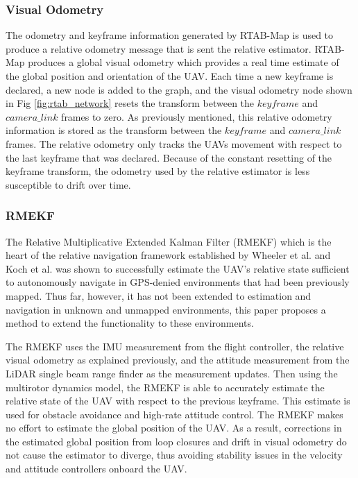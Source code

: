 \documentclass[letterpaper, 10 pt, conference]{ieeeconf}  %
\begin{document}
\subsubsection{Visual Odometry} \label{vis_odom}

The odometry and keyframe information generated by RTAB-Map is used to produce a relative odometry message that is sent the relative estimator. RTAB-Map produces a global visual odometry which provides a real time estimate of the global position and orientation of the UAV. Each time a new keyframe is declared, a new node is added to the graph, and the visual odometry node shown in Fig \ref{fig:rtab_network} resets the transform between the $\mathit{keyframe}$ and $\mathit{camera\_link}$ frames to zero. As previously mentioned, this relative odometry information is stored as the transform between the $\mathit{keyframe}$ and $\mathit{camera\_link}$ frames. The relative odometry only tracks the UAVs movement with respect to the last keyframe that was declared. Because of the constant resetting of the keyframe transform, the odometry used by the relative estimator is less susceptible to drift over time.

\subsubsection{RMEKF}

The Relative Multiplicative Extended Kalman Filter (RMEKF) which is the heart of the relative navigation framework established by Wheeler et al. \cite{Wheeler2017}\cite{Wheeler2018} and Koch et al. \cite{Koch2017} was shown to successfully estimate the UAV's relative state sufficient to autonomously navigate in GPS-denied environments that had been previously mapped. Thus far, however, it has not been extended to estimation and navigation in unknown and unmapped environments, this paper proposes a method to extend the functionality to these environments.

The RMEKF uses the IMU measurement from the flight controller, the relative visual odometry as explained previously, and the attitude measurement from the LiDAR single beam range finder as the measurement updates. Then using the multirotor dynamics model, the RMEKF is able to accurately estimate the relative state of the UAV with respect to the previous keyframe. This estimate is used for obstacle avoidance and high-rate attitude control. The RMEKF makes no effort to estimate the global position of the UAV. As a result, corrections in the estimated global position from loop closures and drift in visual odometry do not cause the estimator to diverge, thus avoiding stability issues in the velocity and attitude controllers onboard the UAV.
\end{document}

